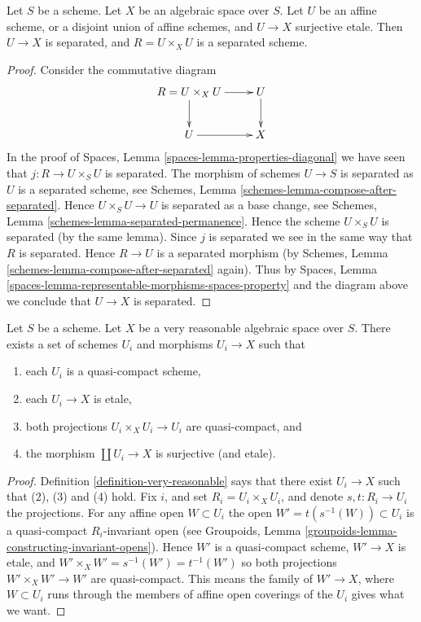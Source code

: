 \begin{lemma}
\label{lemma-algebraic-space-affine-cover}
Let $S$ be a scheme.
Let $X$ be an algebraic space over $S$.
Let $U$ be an affine scheme, or a disjoint union of affine schemes,
and $U \to X$ surjective etale.
Then $U \to X$ is separated, and $R = U \times_X U$ is a separated scheme.
\end{lemma}

\begin{proof}
Consider the commutative diagram
$$
\xymatrix{
R = U \times_X U \ar[r] \ar[d] & U \ar[d] \\
U \ar[r] & X
}
$$
In the proof of Spaces, Lemma \ref{spaces-lemma-properties-diagonal}
we have seen that $j : R \to U \times_S U$ is separated.
The morphism of schemes $U \to S$ is separated as $U$ is a separated
scheme, see 
Schemes, Lemma \ref{schemes-lemma-compose-after-separated}.
Hence $U \times_S U \to U$ is separated as a base change, see
Schemes, Lemma \ref{schemes-lemma-separated-permanence}.
Hence the scheme $U \times_S U$ is separated (by the same lemma).
Since $j$ is separated we see in the same way that $R$ is separated.
Hence $R \to U$ is a separated morphism (by
Schemes, Lemma \ref{schemes-lemma-compose-after-separated}
again). Thus by
Spaces, Lemma \ref{spaces-lemma-representable-morphisms-spaces-property}
and the diagram above we conclude that $U \to X$ is separated.
\end{proof}

\begin{lemma}
\label{lemma-very-reasonable-quasi-compact-pieces}
Let $S$ be a scheme.
Let $X$ be a very reasonable algebraic space over $S$.
There exists a set of schemes
$U_i$ and morphisms $U_i \to X$ such that
\begin{enumerate}
\item each $U_i$ is a quasi-compact scheme,
\item each $U_i \to X$ is etale,
\item both projections $U_i \times_X U_i \to U_i$ are quasi-compact, and
\item the morphism $\coprod U_i \to X$ is surjective (and etale).
\end{enumerate}
\end{lemma}

\begin{proof}
Definition \ref{definition-very-reasonable}
says that there exist $U_i \to X$ such that (2), (3) and (4) hold.
Fix $i$, and set $R_i = U_i \times_X U_i$, and denote $s, t : R_i \to U_i$
the projections.
For any affine open $W \subset U_i$ the open $W' = t(s^{-1}(W)) \subset U_i$
is a quasi-compact $R_i$-invariant open (see
Groupoids, Lemma \ref{groupoids-lemma-constructing-invariant-opens}).
Hence $W'$ is a quasi-compact scheme, $W' \to X$ is etale, and
$W' \times_X W' = s^{-1}(W') = t^{-1}(W')$ so both projections
$W' \times_X W' \to W'$ are quasi-compact. This means the family of
$W' \to X$, where $W \subset U_i$ runs through the members of affine
open coverings of the $U_i$ gives what we want.
\end{proof}

